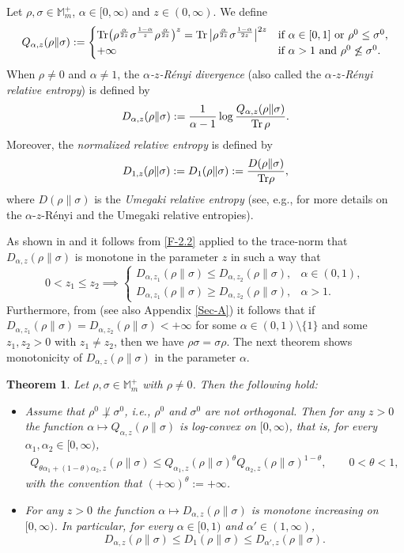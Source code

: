 \documentclass[11pt,reqno]{article}
\newtheorem{theorem}{Theorem}[section]
\numberwithin{equation}{section}
\def\bM{\mathbb{M}}
\def\Tr{\mathrm{Tr}}
\begin{document}
Let $\rho,\sigma\in\bM_m^+$, $\alpha\in[0,\infty)$ and $z\in(0,\infty)$. We define
\[
Q_{\alpha,z}(\rho\|\sigma):=\begin{cases}
\Tr\bigl(\rho^{\alpha\over2z}\sigma^{1-\alpha\over z}\rho^{\alpha\over2z}\bigr)^z
=\Tr\,\big|\rho^{\alpha\over2z}\sigma^{1-\alpha\over2z}\big|^{2z}
& \text{if $\alpha\in[0,1]$ or $\rho^0\le\sigma^0$}, \\
+\infty & \text{if $\alpha>1$ and $\rho^0\not\le\sigma^0$}.
\end{cases}
\]
When $\rho\ne0$ and $\alpha\ne1$, the \emph{$\alpha$-$z$-R\'enyi divergence} (also called the
\emph{$\alpha$-$z$-R\'enyi relative entropy}) is defined by
\[
D_{\alpha,z}(\rho\|\sigma):={1\over\alpha-1}\log{Q_{\alpha,z}(\rho\|\sigma)\over\Tr\,\rho}.
\]
Moreover, the \emph{normalized relative entropy} is defined by
\[
D_{1,z}(\rho\|\sigma):=D_1(\rho\|\sigma):={D(\rho\|\sigma)\over\Tr\rho},
\]
where $D(\rho\|\sigma)$ is the \emph{Umegaki relative entropy} (see, e.g., \cite{MH2} for more details on
the $\alpha$-$z$-R\'enyi and the Umegaki relative entropies).

As shown in \cite[Proposition 1]{LT} and \cite[(II.21)]{MH2} it follows from \eqref{F-2.2} applied to the
trace-norm that $D_{\alpha,z}(\rho\|\sigma)$ is monotone in the parameter $z$ in such a way that
\[
0<z_1\le z_2\implies
\begin{cases}D_{\alpha,z_1}(\rho\|\sigma)\le D_{\alpha,z_2}(\rho\|\sigma), & \alpha\in(0,1),\\
D_{\alpha,z_1}(\rho\|\sigma)\ge D_{\alpha,z_2}(\rho\|\sigma), & \alpha>1.
\end{cases}
\]
Furthermore, from \cite[Theorem 2.1]{Hi} (see also Appendix \ref{Sec-A}) it follows that if
$D_{\alpha,z_1}(\rho\|\sigma)=D_{\alpha,z_2}(\rho\|\sigma)<+\infty$ for some $\alpha\in(0,1)\setminus\{1\}$
and some $z_1,z_2>0$ with $z_1\ne z_2$, then we have $\rho\sigma=\sigma\rho$. The next theorem shows
monotonicity of $D_{\alpha,z}(\rho\|\sigma)$ in the parameter $\alpha$.

\begin{theorem}\label{T-3.1}
Let $\rho,\sigma\in\bM_m^+$ with $\rho\ne0$. Then the following hold:
\begin{itemize}
\item[(i)] Assume that $\rho^0\not\perp\sigma^0$, i.e., $\rho^0$ and $\sigma^0$ are not orthogonal. Then for any
$z>0$ the function $\alpha\mapsto Q_{\alpha,z}(\rho\|\sigma)$ is log-convex on $[0,\infty)$, that is, for every
$\alpha_1,\alpha_2\in[0,\infty)$,
\begin{align}\label{F-3.1}
Q_{\theta\alpha_1+(1-\theta)\alpha_2,z}(\rho\|\sigma)
\le Q_{\alpha_1,z}(\rho\|\sigma)^\theta Q_{\alpha_2,z}(\rho\|\sigma)^{1-\theta},\qquad0<\theta<1,
\end{align}
with the convention that $(+\infty)^\theta:=+\infty$.
\item[(ii)] For any $z>0$ the function $\alpha\mapsto D_{\alpha,z}(\rho\|\sigma)$ is monotone increasing on
$[0,\infty)$. In particular, for every $\alpha\in[0,1)$ and $\alpha'\in(1,\infty)$,
\[
D_{\alpha,z}(\rho\|\sigma)\le D_1(\rho\|\sigma)\le D_{\alpha',z}(\rho\|\sigma).
\]
\end{itemize}
\end{theorem}
\end{document}
